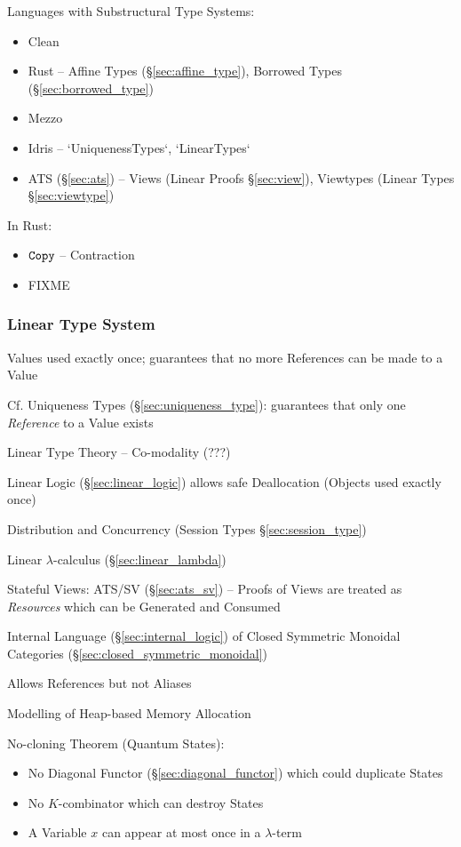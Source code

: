 Languages with Substructural Type Systems:

\begin{itemize}
  \item Clean
  \item Rust -- Affine Types (\S\ref{sec:affine_type}), Borrowed
    Types (\S\ref{sec:borrowed_type})
  \item Mezzo
  \item Idris -- `UniquenessTypes`, `LinearTypes`
  \item ATS (\S\ref{sec:ats}) -- Views (Linear Proofs
    \S\ref{sec:view}), Viewtypes (Linear Types \S\ref{sec:viewtype})
\end{itemize}

In Rust:

\begin{itemize}
  \item $\mathtt{Copy}$ -- Contraction
  \item FIXME
\end{itemize}



\subsubsection{Linear Type System}\label{sec:linear_type}

Values used exactly once; guarantees that no more References can be
made to a Value

\fist Cf. Uniqueness Types (\S\ref{sec:uniqueness_type}): guarantees
that only one \emph{Reference} to a Value exists

Linear Type Theory -- Co-modality (???) %

Linear Logic (\S\ref{sec:linear_logic}) allows safe Deallocation
(Objects used exactly once)

Distribution and Concurrency (Session Types \S\ref{sec:session_type})

Linear $\lambda$-calculus (\S\ref{sec:linear_lambda})

Stateful Views: ATS/SV (\S\ref{sec:ats_sv}) -- Proofs of Views are
treated as \emph{Resources} which can be Generated and Consumed

Internal Language (\S\ref{sec:internal_logic}) of Closed Symmetric
Monoidal Categories (\S\ref{sec:closed_symmetric_monoidal})

Allows References but not Aliases

Modelling of Heap-based Memory Allocation

No-cloning Theorem (Quantum States):
\begin{itemize}
  \item No Diagonal Functor (\S\ref{sec:diagonal_functor})
    which could duplicate States
  \item No $K$-combinator which can destroy States
  \item A Variable $x$ can appear at most once in a $\lambda$-term
\end{itemize}

